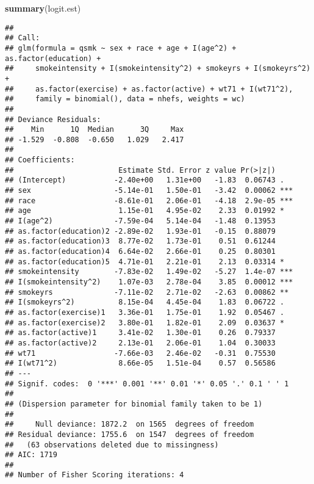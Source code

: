 \documentclass[10pt,]{book}
\newenvironment{Shaded}{\begin{snugshade}}{\end{snugshade}}
\newcommand{\KeywordTok}[1]{\textcolor[rgb]{0.13,0.29,0.53}{\textbf{#1}}}
\newcommand{\NormalTok}[1]{#1}
\begin{document}
\begin{Shaded}
\begin{Highlighting}[]
\KeywordTok{summary}\NormalTok{(logit.est)}
\end{Highlighting}
\end{Shaded}

\begin{verbatim}
## 
## Call:
## glm(formula = qsmk ~ sex + race + age + I(age^2) + as.factor(education) + 
##     smokeintensity + I(smokeintensity^2) + smokeyrs + I(smokeyrs^2) + 
##     as.factor(exercise) + as.factor(active) + wt71 + I(wt71^2), 
##     family = binomial(), data = nhefs, weights = wc)
## 
## Deviance Residuals: 
##    Min      1Q  Median      3Q     Max  
## -1.529  -0.808  -0.650   1.029   2.417  
## 
## Coefficients:
##                        Estimate Std. Error z value Pr(>|z|)    
## (Intercept)           -2.40e+00   1.31e+00   -1.83  0.06743 .  
## sex                   -5.14e-01   1.50e-01   -3.42  0.00062 ***
## race                  -8.61e-01   2.06e-01   -4.18  2.9e-05 ***
## age                    1.15e-01   4.95e-02    2.33  0.01992 *  
## I(age^2)              -7.59e-04   5.14e-04   -1.48  0.13953    
## as.factor(education)2 -2.89e-02   1.93e-01   -0.15  0.88079    
## as.factor(education)3  8.77e-02   1.73e-01    0.51  0.61244    
## as.factor(education)4  6.64e-02   2.66e-01    0.25  0.80301    
## as.factor(education)5  4.71e-01   2.21e-01    2.13  0.03314 *  
## smokeintensity        -7.83e-02   1.49e-02   -5.27  1.4e-07 ***
## I(smokeintensity^2)    1.07e-03   2.78e-04    3.85  0.00012 ***
## smokeyrs              -7.11e-02   2.71e-02   -2.63  0.00862 ** 
## I(smokeyrs^2)          8.15e-04   4.45e-04    1.83  0.06722 .  
## as.factor(exercise)1   3.36e-01   1.75e-01    1.92  0.05467 .  
## as.factor(exercise)2   3.80e-01   1.82e-01    2.09  0.03637 *  
## as.factor(active)1     3.41e-02   1.30e-01    0.26  0.79337    
## as.factor(active)2     2.13e-01   2.06e-01    1.04  0.30033    
## wt71                  -7.66e-03   2.46e-02   -0.31  0.75530    
## I(wt71^2)              8.66e-05   1.51e-04    0.57  0.56586    
## ---
## Signif. codes:  0 '***' 0.001 '**' 0.01 '*' 0.05 '.' 0.1 ' ' 1
## 
## (Dispersion parameter for binomial family taken to be 1)
## 
##     Null deviance: 1872.2  on 1565  degrees of freedom
## Residual deviance: 1755.6  on 1547  degrees of freedom
##   (63 observations deleted due to missingness)
## AIC: 1719
## 
## Number of Fisher Scoring iterations: 4
\end{verbatim}
\end{document}
